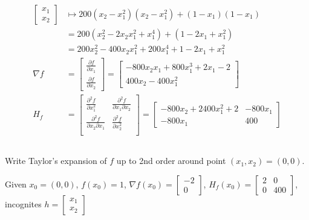 \documentclass[unicode,11pt,a4paper,oneside,numbers=endperiod,openany]{scrartcl}
\begin{document}
\begin{equation*}
\begin{aligned}
    \begin{bmatrix} x_1 \\ x_2 \end{bmatrix}
     & \mapsto 200 (x_2 - x_1^2) (x_2 - x_1^2) + (1 - x_1) (1 - x_1) \\
     & = 200 (x_2^2 - 2x_2 x_1^2 + x_1^4) + (1 - 2x_1 + x_1^2)       \\
     & = 200 x_2^2 - 400 x_2 x_1^2 + 200 x_1^4 + 1 - 2x_1 + x_1^2    \\
    \nabla f
     & = \begin{bmatrix}
             \frac{\partial f}{\partial x_1} \\
             \frac{\partial f}{\partial x_2}
         \end{bmatrix}
        = \begin{bmatrix}
          -800 x_2 x_1 + 800 x_1^3 + 2x_1 - 2 \\
          400 x_2 - 400 x_1^2
        \end{bmatrix} \\
    H_f
     & =\begin{bmatrix}
            \frac{\partial^2 f}{\partial x_1^2}            
            & \frac{\partial^2 f}{\partial x_1 \partial x_2} \\
            \frac{\partial^2 f}{\partial x_2 \partial x_1} 
            & \frac{\partial^2 f}{\partial x_2^2}            \\
        \end{bmatrix}
        = \begin{bmatrix}
          -800 x_2 + 2400 x_1^2 + 2 & - 800 x_1 \\
          -800 x_1                  & 400
        \end{bmatrix}
\end{aligned}
\end{equation*}

\subsection{}
Write Taylor's expansion of $f$ up to 2nd order around point
$(x_1, x_2) = (0, 0)$. \newline

Given $x_0 = (0, 0)$, $f(x_0) = 1$, 
$\nabla f(x_0) = \begin{bmatrix} -2 \\ 0 \end{bmatrix}$, 
$H_f(x_0) = \begin{bmatrix} 2 & 0 \\ 0 & 400 \end{bmatrix}$, 
incognites $h = \begin{bmatrix} x_1 \\ x_2 \end{bmatrix}$
\end{document}
